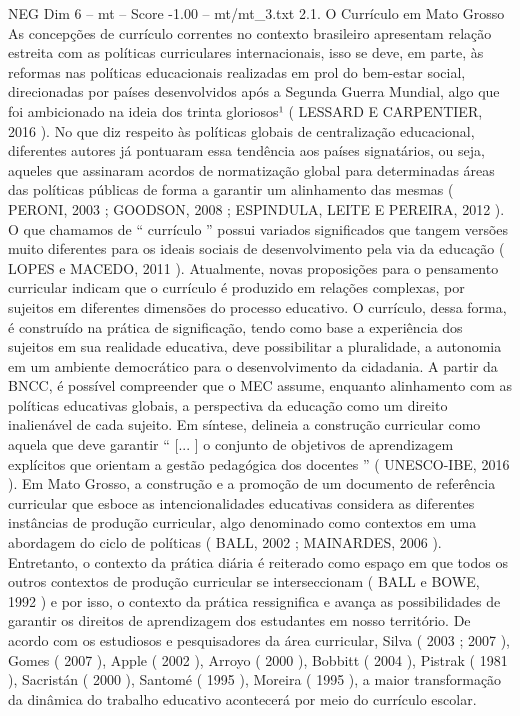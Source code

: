 \begin{textsample}{NEG Dim 6 – mt – Score -1.00 – mt/mt\_3.txt}  \label{ex:f6_neg_121}
2.1.
O Currículo em Mato Grosso As concepções de currículo correntes no contexto brasileiro apresentam relação estreita com as políticas curriculares internacionais, isso se deve, em parte, às reformas nas políticas educacionais realizadas em prol do bem-estar social, direcionadas por países desenvolvidos após a Segunda Guerra Mundial, algo que foi ambicionado na ideia dos trinta gloriosos¹ ( LESSARD E CARPENTIER, 2016 ).
No que diz respeito às políticas globais de centralização educacional, diferentes autores já pontuaram essa tendência aos países signatários, ou seja, aqueles que assinaram acordos de normatização global para determinadas áreas das políticas públicas de forma a garantir um alinhamento das mesmas ( PERONI, 2003 ; GOODSON, 2008 ; ESPINDULA, LEITE E PEREIRA, 2012 ).
O que chamamos de “ currículo ” possui variados significados que tangem versões muito diferentes para os ideais sociais de desenvolvimento pela via da educação ( LOPES e MACEDO, 2011 ).
Atualmente, novas proposições para o pensamento curricular indicam que o currículo é produzido em relações complexas, por sujeitos em diferentes dimensões do processo educativo.
O currículo, dessa forma, é construído na prática de significação, tendo como base a experiência dos sujeitos em sua realidade educativa, deve possibilitar a pluralidade, a autonomia em um ambiente democrático para o desenvolvimento da cidadania.
A partir da BNCC, é possível compreender que o MEC assume, enquanto alinhamento com as políticas educativas globais, a perspectiva da educação como um direito inalienável de cada sujeito.
Em síntese, delineia a construção curricular como aquela que deve garantir “ [... ] o conjunto de objetivos de aprendizagem explícitos que orientam a gestão pedagógica dos docentes ” ( UNESCO-IBE, 2016 ).
Em Mato Grosso, a construção e a promoção de um documento de referência curricular que esboce as intencionalidades educativas considera as diferentes instâncias de produção curricular, algo denominado como contextos em uma abordagem do ciclo de políticas ( BALL, 2002 ; MAINARDES, 2006 ).
Entretanto, o contexto da prática diária é reiterado como espaço em que todos os outros contextos de produção curricular se interseccionam ( BALL e BOWE, 1992 ) e por isso, o contexto da prática ressignifica e avança as possibilidades de garantir os direitos de aprendizagem dos estudantes em nosso território.
De acordo com os estudiosos e pesquisadores da área curricular, Silva ( 2003 ; 2007 ), Gomes ( 2007 ), Apple ( 2002 ), Arroyo ( 2000 ), Bobbitt ( 2004 ), Pistrak ( 1981 ), Sacristán ( 2000 ), Santomé ( 1995 ), Moreira ( 1995 ), a maior transformação da dinâmica do trabalho educativo acontecerá por meio do currículo escolar.

\end{textsample}
